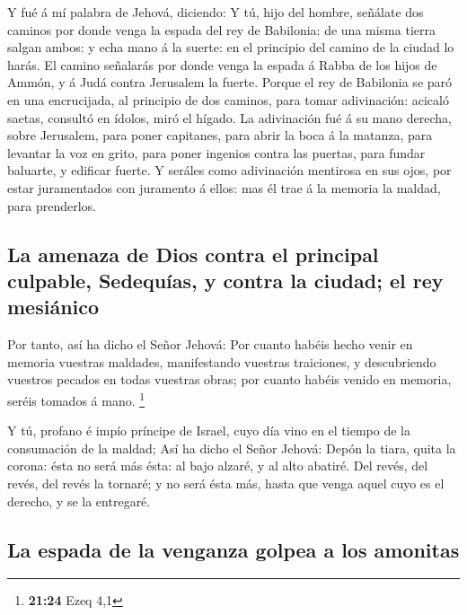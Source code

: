  Y fué á mí palabra de Jehová, diciendo: 
Y tú, hijo del hombre, señálate dos caminos por donde venga la espada
del rey de Babilonia: de una misma tierra salgan ambos: y echa mano á la
suerte: en el principio del camino de la ciudad lo harás.
 El camino señalarás por donde venga la espada á Rabba de
los hijos de Ammón, y á Judá contra Jerusalem la fuerte. 
Porque el rey de Babilonia se paró en una encrucijada, al principio de
dos caminos, para tomar adivinación: acicaló saetas, consultó en ídolos,
miró el hígado.  La adivinación fué á su mano derecha,
sobre Jerusalem, para poner capitanes, para abrir la boca á la matanza,
para levantar la voz en grito, para poner ingenios contra las puertas,
para fundar baluarte, y edificar fuerte.  Y seráles como
adivinación mentirosa en sus ojos, por estar juramentados con juramento
á ellos: mas él trae á la memoria la maldad, para prenderlos.

\hypertarget{la-amenaza-de-dios-contra-el-principal-culpable-sedequuxedas-y-contra-la-ciudad-el-rey-mesiuxe1nico}{%
\subsection{La amenaza de Dios contra el principal culpable, Sedequías,
y contra la ciudad; el rey
mesiánico}\label{la-amenaza-de-dios-contra-el-principal-culpable-sedequuxedas-y-contra-la-ciudad-el-rey-mesiuxe1nico}}

 Por tanto, así ha dicho el Señor Jehová: Por cuanto
habéis hecho venir en memoria vuestras maldades, manifestando vuestras
traiciones, y descubriendo vuestros pecados en todas vuestras obras; por
cuanto habéis venido en memoria, seréis tomados á mano. \footnote{\textbf{21:24}
  Ezeq 4,1}

 Y tú, profano é impío príncipe de Israel, cuyo día vino
en el tiempo de la consumación de la maldad;  Así ha
dicho el Señor Jehová: Depón la tiara, quita la corona: ésta no será más
ésta: al bajo alzaré, y al alto abatiré.  Del revés, del
revés, del revés la tornaré; y no será ésta más, hasta que venga aquel
cuyo es el derecho, y se la entregaré.

\hypertarget{la-espada-de-la-venganza-golpea-a-los-amonitas}{%
\subsection{La espada de la venganza golpea a los
amonitas}\label{la-espada-de-la-venganza-golpea-a-los-amonitas}}

